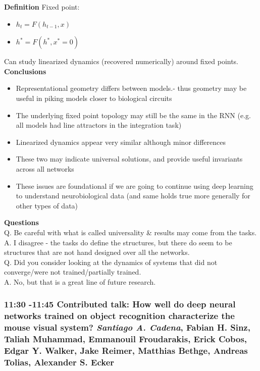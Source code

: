 \documentclass[12pt]{article}
\begin{document}
\textbf{Definition} Fixed point: 
\begin{itemize}
    \item $h_t = F(h_{t-1},x)$
    \item $h^* = F(h^*, x^* = 0)$
\end{itemize}

Can study linearized dynamics (recovered numerically) around fixed points. \\

\textbf{Conclusions}
\begin{itemize}
\item Representational geometry differs between models.- thus geometry may be useful in piking models closer to biological circuits
\item The underlying fixed point topology may still be the same in the RNN (e.g. all models had line attractors in the integration task)
\item Linearized dynamics appear very similar although minor differences
\item These two may indicate universal solutions, and provide useful invariants across all networks
\item These issues are foundational if we are going to continue using deep learning to understand neurobiological data (and same holds true more generally for other types of data)
\end{itemize}

\textbf{Questions} \\

Q. Be careful with what is called universality  \& results may come from the tasks. \\

A. I disagree - the tasks do define the structures, but there do seem to be structures that are not hand designed over all the networks. \\

Q. Did you consider looking at the dynamics of systems that did not converge/were not trained/partially trained. \\

A. No, but that is a great line of future research. 


\subsubsection{11:30 -11:45 Contributed talk: How well do deep neural networks trained on object recognition characterize the mouse visual system? \textit{Santiago A. Cadena}, Fabian H. Sinz, Taliah Muhammad, Emmanouil Froudarakis, Erick Cobos, Edgar Y. Walker, Jake Reimer, Matthias Bethge, Andreas Tolias, Alexander S. Ecker}
\end{document}
